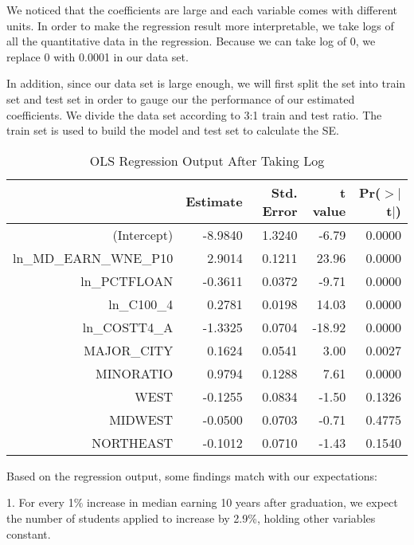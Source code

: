 \documentclass{article}
\begin{document}
We noticed that the coefficients are large and each variable comes with different units. In order to make the regression result more interpretable, we take logs of all the quantitative data in the regression. Because we can take log of 0, we replace 0 with 0.0001 in our data set.

In addition, since our data set is large enough, we will first split the set into train set and test set in order to gauge our the performance of our estimated coefficients. We divide the data set according to 3:1 train and test ratio. The train set is used to build the model and test set to calculate the SE.

\begin{Schunk}
\begin{Soutput}
\begin{table}[H]
\centering
\begin{tabular}{rrrrr}
  \hline
 & Estimate & Std. Error & t value & Pr($>$$|$t$|$) \\ 
  \hline
(Intercept) & -8.9840 & 1.3240 & -6.79 & 0.0000 \\ 
  ln\_MD\_EARN\_WNE\_P10 & 2.9014 & 0.1211 & 23.96 & 0.0000 \\ 
  ln\_PCTFLOAN & -0.3611 & 0.0372 & -9.71 & 0.0000 \\ 
  ln\_C100\_4 & 0.2781 & 0.0198 & 14.03 & 0.0000 \\ 
  ln\_COSTT4\_A & -1.3325 & 0.0704 & -18.92 & 0.0000 \\ 
  MAJOR\_CITY & 0.1624 & 0.0541 & 3.00 & 0.0027 \\ 
  MINORATIO & 0.9794 & 0.1288 & 7.61 & 0.0000 \\ 
  WEST & -0.1255 & 0.0834 & -1.50 & 0.1326 \\ 
  MIDWEST & -0.0500 & 0.0703 & -0.71 & 0.4775 \\ 
  NORTHEAST & -0.1012 & 0.0710 & -1.43 & 0.1540 \\ 
   \hline
\end{tabular}
\caption{OLS Regression Output After Taking Log} 
\end{table}
\end{Soutput}
\end{Schunk}

Based on the regression output, some findings match with our expectations:

1. For every 1\% increase in median earning 10 years after graduation, we expect the number of students applied to  increase by 2.9\%, holding other variables constant.
\end{document}
